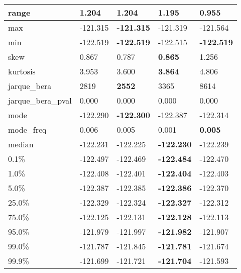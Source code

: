 \begin{table}[H]
\begin{tabular}{|l|m{10em}|m{10em}|m{10em}|m{10em}|}
\hline range & 1.204 & \bfseries 1.204 & 1.195 & \cellcolor[rgb]{0.9, 0.54, 0.52} 0.955 \\
\hline max & -121.315 & \bfseries -121.315 & -121.319 & \cellcolor[rgb]{0.9, 0.54, 0.52} -121.564 \\
\hline min & -122.519 & \bfseries -122.519 & \cellcolor[rgb]{0.9, 0.54, 0.52} -122.515 & \bfseries -122.519 \\
\hline skew & 0.867 & 0.787 & \bfseries 0.865 & \cellcolor[rgb]{0.9, 0.54, 0.52} 1.256 \\
\hline kurtosis & 3.953 & 3.600 & \bfseries 3.864 & \cellcolor[rgb]{0.9, 0.54, 0.52} 4.806 \\
\hline jarque\_bera & 2819 & \bfseries 2552 & 3365 & \cellcolor[rgb]{0.9, 0.54, 0.52} 8614 \\
\hline jarque\_bera\_pval & 0.000 & 0.000 & 0.000 & 0.000 \\
\hline mode & -122.290 & \bfseries -122.300 & \cellcolor[rgb]{0.9, 0.54, 0.52} -122.387 & -122.314 \\
\hline mode\_freq & 0.006 & 0.005 & \cellcolor[rgb]{0.9, 0.54, 0.52} 0.001 & \bfseries 0.005 \\
\hline median & -122.231 & -122.225 & \bfseries -122.230 & \cellcolor[rgb]{0.9, 0.54, 0.52} -122.239 \\
\hline 0.1\% & -122.497 & \cellcolor[rgb]{0.9, 0.54, 0.52} -122.469 & \bfseries -122.484 & -122.470 \\
\hline 1.0\% & -122.408 & \cellcolor[rgb]{0.9, 0.54, 0.52} -122.401 & \bfseries -122.404 & -122.403 \\
\hline 5.0\% & -122.387 & -122.385 & \bfseries -122.386 & \cellcolor[rgb]{0.9, 0.54, 0.52} -122.370 \\
\hline 25.0\% & -122.329 & -122.324 & \bfseries -122.327 & \cellcolor[rgb]{0.9, 0.54, 0.52} -122.312 \\
\hline 75.0\% & -122.125 & -122.131 & \bfseries -122.128 & \cellcolor[rgb]{0.9, 0.54, 0.52} -122.113 \\
\hline 95.0\% & -121.979 & -121.997 & \bfseries -121.982 & \cellcolor[rgb]{0.9, 0.54, 0.52} -121.907 \\
\hline 99.0\% & -121.787 & -121.845 & \bfseries -121.781 & \cellcolor[rgb]{0.9, 0.54, 0.52} -121.674 \\
\hline 99.9\% & -121.699 & -121.721 & \bfseries -121.704 & \cellcolor[rgb]{0.9, 0.54, 0.52} -121.593 \\
\hline
\end{tabular}
\end{table}
